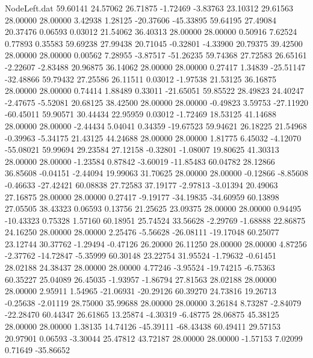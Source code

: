 \begin{filecontents}{NodeLeft.dat}
  59.60141   24.57062   26.71875    -1.72469   -3.83763   23.10312   29.61563   28.00000   28.00000    3.42938    1.28125  -20.37606  -45.33895
  59.64195   27.49084   20.37476     0.06593    0.03012   21.54062   36.40313   28.00000   28.00000    0.50916    7.62524    0.77893    0.35583
  59.69238   27.99438   20.71045    -0.32801   -4.33900   20.79375   39.42500   28.00000   28.00000    0.00562    7.28955   -3.87517  -51.26235
  59.74368   27.72583   26.65161    -2.22607   -2.83488   20.96875   36.14062   28.00000   28.00000    0.27417    1.34839  -25.51147  -32.48866
  59.79432   27.25586   26.11511     0.03012   -1.97538   21.53125   36.16875   28.00000   28.00000    0.74414    1.88489    0.33011  -21.65051
  59.85522   28.49823   24.40247    -2.47675   -5.52081   20.68125   38.42500   28.00000   28.00000   -0.49823    3.59753  -27.11920  -60.45011
  59.90571   30.44434   22.95959     0.03012   -1.72469   18.53125   41.14688   28.00000   28.00000   -2.44434    5.04041    0.34359  -19.67523
  59.94621   26.18225   21.54968    -0.39963   -5.34175   21.43125   44.24688   28.00000   28.00000    1.81775    6.45032   -4.12070  -55.08021
  59.99694   29.23584   27.12158    -0.32801   -1.08007   19.80625   41.30313   28.00000   28.00000   -1.23584    0.87842   -3.60019  -11.85483
  60.04782   28.12866   36.85608    -0.04151   -2.44094   19.99063   31.70625   28.00000   28.00000   -0.12866   -8.85608   -0.46633  -27.42421
  60.08838   27.72583   37.19177    -2.97813   -3.01394   20.49063   27.16875   28.00000   28.00000    0.27417   -9.19177  -34.19835  -34.60959
  60.13898   27.05505   38.43323     0.06593    0.13756   21.25625   23.09375   28.00000   28.00000    0.94495  -10.43323    0.75328    1.57160
  60.18951   25.74524   33.56628    -2.29769   -1.68888   22.86875   24.16250   28.00000   28.00000    2.25476   -5.56628  -26.08111  -19.17048
  60.25077   23.12744   30.37762    -1.29494   -0.47126   26.20000   26.11250   28.00000   28.00000    4.87256   -2.37762  -14.72847   -5.35999
  60.30148   23.22754   31.95524    -1.79632   -0.61451   28.02188   24.38437   28.00000   28.00000    4.77246   -3.95524  -19.74215   -6.75363
  60.35227   25.04089   26.45035    -1.93957   -1.86794   27.81563   28.02188   28.00000   28.00000    2.95911    1.54965  -21.06931  -20.29126
  60.39270   24.73816   19.26713    -0.25638   -2.01119   28.75000   35.99688   28.00000   28.00000    3.26184    8.73287   -2.84079  -22.28470
  60.44347   26.61865   13.25874    -4.30319   -6.48775   28.06875   45.38125   28.00000   28.00000    1.38135   14.74126  -45.39111  -68.43438
  60.49411   29.57153   20.97901     0.06593   -3.30044   25.47812   43.72187   28.00000   28.00000   -1.57153    7.02099    0.71649  -35.86652

\end{filecontents}
